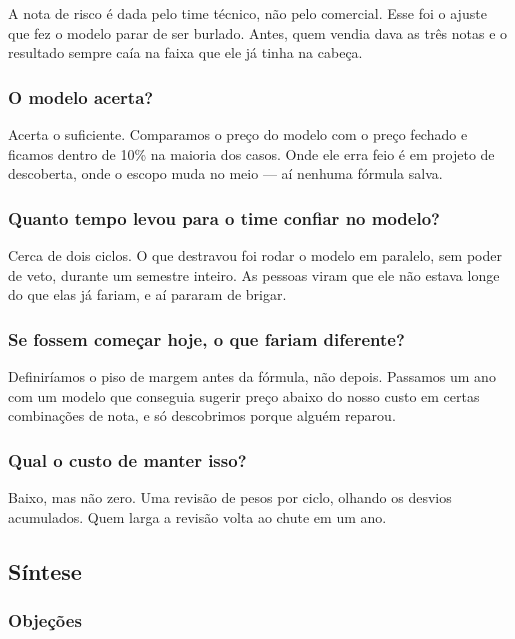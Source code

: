 A nota de risco é dada pelo time técnico, não pelo comercial. Esse foi o ajuste que fez o modelo parar de ser burlado. Antes, quem vendia dava as três notas e o resultado sempre caía na faixa que ele já tinha na cabeça.

\subsubsection{O modelo acerta?}

Acerta o suficiente. Comparamos o preço do modelo com o preço fechado e ficamos dentro de 10\% na maioria dos casos. Onde ele erra feio é em projeto de descoberta, onde o escopo muda no meio — aí nenhuma fórmula salva.

\subsubsection{Quanto tempo levou para o time confiar no modelo?}

Cerca de dois ciclos. O que destravou foi rodar o modelo em paralelo, sem poder de veto, durante um semestre inteiro. As pessoas viram que ele não estava longe do que elas já fariam, e aí pararam de brigar.

\subsubsection{Se fossem começar hoje, o que fariam diferente?}

Definiríamos o piso de margem antes da fórmula, não depois. Passamos um ano com um modelo que conseguia sugerir preço abaixo do nosso custo em certas combinações de nota, e só descobrimos porque alguém reparou.

\subsubsection{Qual o custo de manter isso?}

Baixo, mas não zero. Uma revisão de pesos por ciclo, olhando os desvios acumulados. Quem larga a revisão volta ao chute em um ano.

\subsection{Síntese}

\subsubsection{Objeções}

